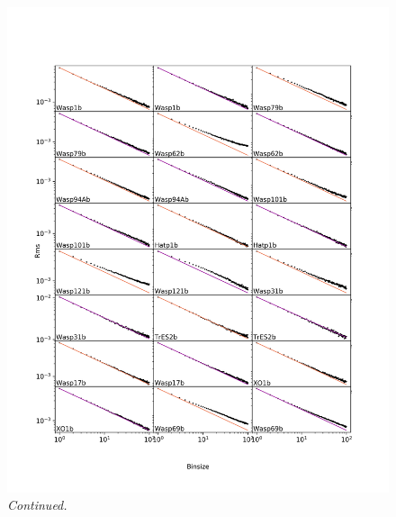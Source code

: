 \begin{subappendices}
  \addtocounter{figure}{-1}
  \begin{figure}
    \includegraphics[width=\textwidth]{rmsVsbinsize1.pdf}
    \caption{\textit{Continued.}}
  \end{figure}


\end{subappendices}
